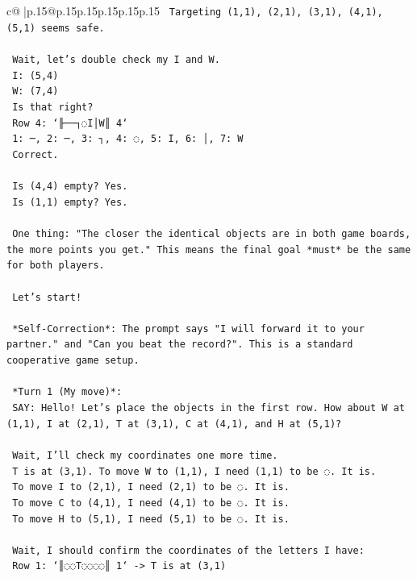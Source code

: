 \documentclass{article}
\begin{document}
{\begin{supertabular}{c@{$\;$}|p{.15\linewidth}@{}p{.15\linewidth}p{.15\linewidth}p{.15\linewidth}p{.15\linewidth}p{.15\linewidth}}
{{{\texttt{    Targeting (1,1), (2,1), (3,1), (4,1), (5,1) seems safe.} \\
\\ 
\texttt{    Wait, let's double check my I and W.} \\
\texttt{    I: (5,4)} \\
\texttt{    W: (7,4)} \\
\texttt{    Is that right?} \\
\texttt{    Row 4: `╟──┐◌I│W║ 4`} \\
\texttt{    1: ─, 2: ─, 3: ┐, 4: ◌, 5: I, 6: │, 7: W} \\
\texttt{    Correct.} \\
\\ 
\texttt{    Is (4,4) empty? Yes.} \\
\texttt{    Is (1,1) empty? Yes.} \\
\\ 
\texttt{    One thing: "The closer the identical objects are in both game boards, the more points you get." This means the final goal *must* be the same for both players.} \\
\\ 
\texttt{    Let's start!} \\
\\ 
\texttt{    *Self{-}Correction*: The prompt says "I will forward it to your partner." and "Can you beat the record?". This is a standard cooperative game setup.} \\
\\ 
\texttt{    *Turn 1 (My move)*:} \\
\texttt{    SAY: Hello! Let's place the objects in the first row. How about W at (1,1), I at (2,1), T at (3,1), C at (4,1), and H at (5,1)?} \\
\\ 
\texttt{    Wait, I'll check my coordinates one more time.} \\
\texttt{    T is at (3,1). To move W to (1,1), I need (1,1) to be ◌. It is.} \\
\texttt{    To move I to (2,1), I need (2,1) to be ◌. It is.} \\
\texttt{    To move C to (4,1), I need (4,1) to be ◌. It is.} \\
\texttt{    To move H to (5,1), I need (5,1) to be ◌. It is.} \\
\\ 
\texttt{    Wait, I should confirm the coordinates of the letters I have:} \\
\texttt{    Row 1: `║◌◌T◌◌◌◌║ 1` {-}> T is at (3,1)} \\
}}}
\end{supertabular}}
\end{document}
